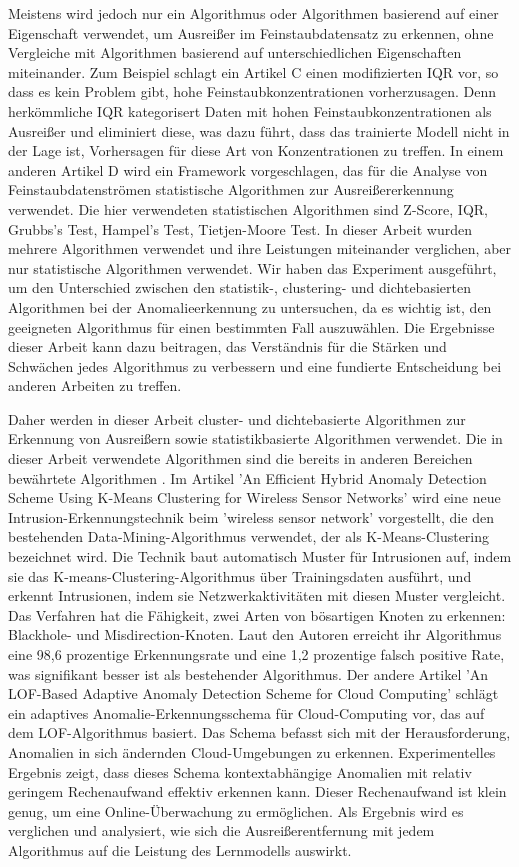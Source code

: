 	Meistens wird jedoch nur ein Algorithmus oder Algorithmen basierend auf einer Eigenschaft verwendet, um Ausreißer im Feinstaubdatensatz zu erkennen, ohne Vergleiche mit Algorithmen basierend auf unterschiedlichen Eigenschaften miteinander. Zum Beispiel schlagt ein Artikel C einen modifizierten IQR vor, so dass es kein Problem gibt, hohe Feinstaubkonzentrationen vorherzusagen. Denn herkömmliche IQR kategorisert Daten mit hohen Feinstaubkonzentrationen als Ausreißer und eliminiert diese, was dazu führt, dass das trainierte Modell nicht in der Lage ist, Vorhersagen für diese Art von Konzentrationen zu treffen. In einem anderen Artikel D wird ein Framework vorgeschlagen, das für die Analyse von Feinstaubdatenströmen statistische Algorithmen zur Ausreißererkennung verwendet. Die hier verwendeten statistischen Algorithmen sind Z-Score, IQR, Grubbs's Test, Hampel's Test, Tietjen-Moore Test. In dieser Arbeit wurden mehrere Algorithmen verwendet und ihre Leistungen miteinander verglichen, aber nur statistische Algorithmen verwendet. Wir haben das Experiment ausgeführt, um den Unterschied zwischen den statistik-, clustering- und dichtebasierten Algorithmen bei der Anomalieerkennung zu untersuchen, da es wichtig ist, den geeigneten Algorithmus für einen bestimmten Fall auszuwählen. Die Ergebnisse dieser Arbeit kann dazu beitragen, das Verständnis für die Stärken und Schwächen jedes Algorithmus zu verbessern und eine fundierte Entscheidung bei anderen Arbeiten zu treffen.

	Daher werden in dieser Arbeit cluster- und dichtebasierte Algorithmen zur Erkennung von Ausreißern sowie statistikbasierte Algorithmen verwendet. Die in dieser Arbeit verwendete Algorithmen sind die bereits in anderen Bereichen bewährtete Algorithmen \cite{}. Im Artikel 'An Efficient Hybrid Anomaly Detection Scheme Using K-Means Clustering for Wireless Sensor Networks' wird eine neue Intrusion-Erkennungstechnik beim 'wireless sensor network' vorgestellt, die den bestehenden Data-Mining-Algorithmus verwendet, der als K-Means-Clustering bezeichnet wird. Die Technik baut automatisch Muster für Intrusionen auf, indem sie das K-means-Clustering-Algorithmus über Trainingsdaten ausführt, und erkennt Intrusionen, indem sie Netzwerkaktivitäten mit diesen Muster vergleicht. Das Verfahren hat die Fähigkeit, zwei Arten von bösartigen Knoten zu erkennen: Blackhole- und Misdirection-Knoten. Laut den Autoren erreicht ihr Algorithmus eine 98,6 prozentige Erkennungsrate und eine 1,2 prozentige falsch positive Rate, was signifikant besser ist als bestehender Algorithmus. Der andere Artikel 'An LOF-Based Adaptive Anomaly Detection Scheme for Cloud Computing' schlägt ein adaptives Anomalie-Erkennungsschema für Cloud-Computing vor, das auf dem LOF-Algorithmus basiert. Das Schema befasst sich mit der Herausforderung, Anomalien in sich ändernden Cloud-Umgebungen zu erkennen. Experimentelles Ergebnis zeigt, dass dieses Schema kontextabhängige Anomalien mit relativ geringem Rechenaufwand effektiv erkennen kann. Dieser Rechenaufwand ist klein genug, um eine Online-Überwachung zu ermöglichen. Als Ergebnis wird es verglichen und analysiert, wie sich die Ausreißerentfernung mit jedem Algorithmus auf die Leistung des Lernmodells auswirkt.